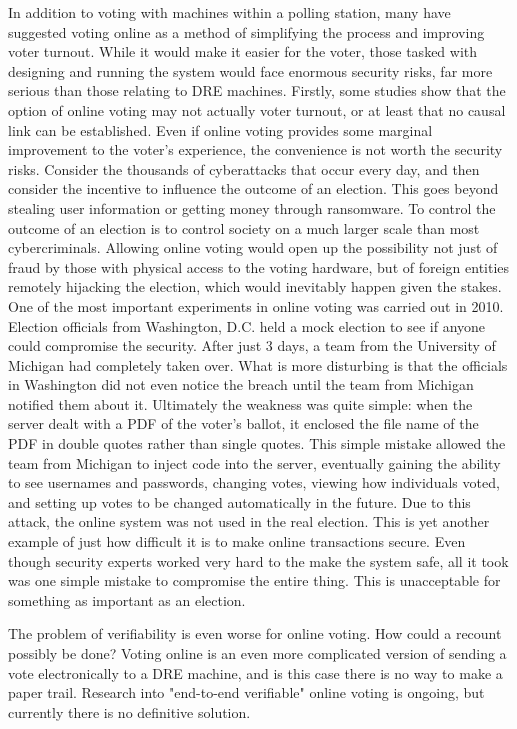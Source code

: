 \documentclass[12pt, titlepage]{article}
\begin{document}
In addition to voting with machines within a polling station, many have suggested voting online as a method of simplifying the process and improving voter turnout. While it would make it easier for the voter, those tasked with designing and running the system would face enormous security risks, far more serious than those relating to DRE machines. Firstly, some studies show that the option of online voting may not actually voter turnout, or at least that no causal link can be established. \cite{germann2017internet} \cite{estonianturnout} Even if online voting provides some marginal improvement to the voter's experience, the convenience is not worth the security risks. Consider the thousands of cyberattacks that occur every day, and then consider the incentive to influence the outcome of an election. This goes beyond stealing user information or getting money through ransomware. To control the outcome of an election is to control society on a much larger scale than most cybercriminals. Allowing online voting would open up the possibility not just of fraud by those with physical access to the voting hardware, but of foreign entities remotely hijacking the election, which would inevitably happen given the stakes. One of the most important experiments in online voting was carried out in 2010. Election officials from Washington, D.C. held a mock election to see if anyone could compromise the security. After just 3 days, a team from the University of Michigan had completely taken over. What is more disturbing is that the officials in Washington did not even notice the breach until the team from Michigan notified them about it. \cite{hao2016real} Ultimately the weakness was quite simple: when the server dealt with a PDF of the voter's ballot, it enclosed the file name of the PDF in double quotes rather than single quotes. This simple mistake allowed the team from Michigan to inject code into the server, eventually gaining the ability to see usernames and passwords, changing votes, viewing how individuals voted, and setting up votes to be changed automatically in the future. Due to this attack, the online system was not used in the real election. This is yet another example of just how difficult it is to make online transactions secure. Even though security experts worked very hard to the make the system safe, all it took was one simple mistake to compromise the entire thing. This is unacceptable for something as important as an election.

The problem of verifiability is even worse for online voting. How could a recount possibly be done? Voting online is an even more complicated version of sending a vote electronically to a DRE machine, and is this case there is no way to make a paper trail. Research into "end-to-end verifiable" online voting is ongoing, but currently there is no definitive solution.



\newpage
\printbibliography
\end{document}
